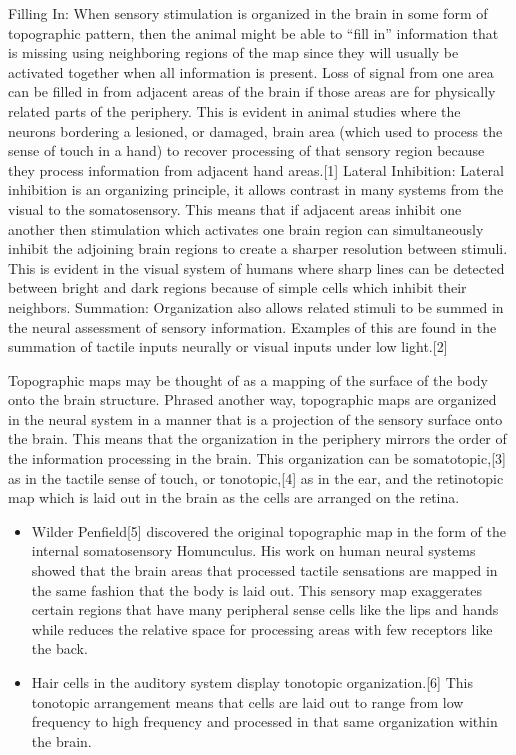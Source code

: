 \documentclass[]{book}
\providecommand{\tightlist}{%
  \setlength{\itemsep}{0pt}\setlength{\parskip}{0pt}}
\begin{document}
Filling In: When sensory stimulation is organized in the brain in some form of topographic pattern, then the animal might be able to ``fill in'' information that is missing using neighboring regions of the map since they will usually be activated together when all information is present. Loss of signal from one area can be filled in from adjacent areas of the brain if those areas are for physically related parts of the periphery. This is evident in animal studies where the neurons bordering a lesioned, or damaged, brain area (which used to process the sense of touch in a hand) to recover processing of that sensory region because they process information from adjacent hand areas.{[}1{]}
Lateral Inhibition: Lateral inhibition is an organizing principle, it allows contrast in many systems from the visual to the somatosensory. This means that if adjacent areas inhibit one another then stimulation which activates one brain region can simultaneously inhibit the adjoining brain regions to create a sharper resolution between stimuli. This is evident in the visual system of humans where sharp lines can be detected between bright and dark regions because of simple cells which inhibit their neighbors.
Summation: Organization also allows related stimuli to be summed in the neural assessment of sensory information. Examples of this are found in the summation of tactile inputs neurally or visual inputs under low light.{[}2{]}

Topographic maps may be thought of as a mapping of the surface of the body onto the brain structure. Phrased another way, topographic maps are organized in the neural system in a manner that is a projection of the sensory surface onto the brain. This means that the organization in the periphery mirrors the order of the information processing in the brain. This organization can be somatotopic,{[}3{]} as in the tactile sense of touch, or tonotopic,{[}4{]} as in the ear, and the retinotopic map which is laid out in the brain as the cells are arranged on the retina.

\begin{itemize}
\tightlist
\item
  Wilder Penfield{[}5{]} discovered the original topographic map in the form of the internal somatosensory Homunculus. His work on human neural systems showed that the brain areas that processed tactile sensations are mapped in the same fashion that the body is laid out. This sensory map exaggerates certain regions that have many peripheral sense cells like the lips and hands while reduces the relative space for processing areas with few receptors like the back.
\item
  Hair cells in the auditory system display tonotopic organization.{[}6{]} This tonotopic arrangement means that cells are laid out to range from low frequency to high frequency and processed in that same organization within the brain.
\end{itemize}
\end{document}
